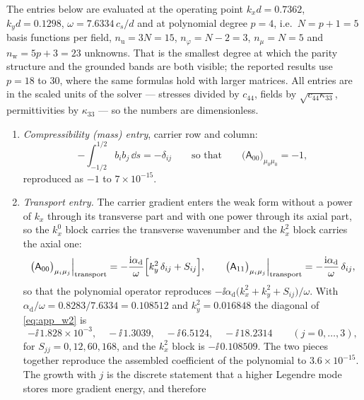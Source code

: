 The entries below are evaluated at the operating point $k_xd=0.7362$,
$k_yd=0.1298$, $\omega=7.6334\,c_s/d$ and at polynomial degree $p=4$, i.e.\
$N=p+1=5$ basis functions per field, $n_{\mathrm{u}}=3N=15$, $n_\varphi=N-2=3$,
$n_\mu=N=5$ and $n_{\mathrm{w}}=5p+3=23$ unknowns.  That is the smallest degree at
which the parity structure and the grounded bands are both visible; the reported
results use $p=18$ to $30$, where the same formulas hold with larger matrices.
All entries are in the scaled units of the solver --- stresses divided by
$c_{44}$, fields by $\sqrt{c_{44}\kappa_{33}}$, permittivities by
$\kappa_{33}$ --- so the numbers are dimensionless.

\begin{enumerate}
\item \emph{Compressibility (mass) entry}, carrier row and column:
\begin{equation}
\label{eq:app_w1}
-\int_{-1/2}^{1/2}b_ib_j\,\dd s=-\delta_{ij}
\qquad\text{so that}\qquad
\bigl(\mathsf A_{00}\bigr)_{\mu_0\mu_0}=-1 ,
\end{equation}
reproduced as $-1$ to $7\times10^{-15}$.
\item \emph{Transport entry.}  The carrier gradient enters the weak form without a
power of $k_x$ through its transverse part and with one power through its axial
part, so the $k_x^{0}$ block carries the transverse wavenumber and the $k_x^{2}$
block carries the axial one:
\begin{equation}
\label{eq:app_w2}
\bigl(\mathsf A_{00}\bigr)_{\mu_i\mu_j}\Big|_{\text{transport}}
=-\frac{\mathrm{i}\alpha_{\mathrm d}}{\omega}\Bigl[k_y^{2}\,\delta_{ij}+S_{ij}\Bigr],
\qquad
\bigl(\mathsf A_{11}\bigr)_{\mu_i\mu_j}\Big|_{\text{transport}}
=-\frac{\mathrm{i}\alpha_{\mathrm d}}{\omega}\,\delta_{ij} ,
\end{equation}
so that the polynomial operator reproduces
$-\ii\alpha_{\mathrm d}\bigl(k_x^{2}+k_y^{2}+S_{ij}\bigr)/\omega$.  With
$\alpha_{\mathrm d}/\omega=0.8283/7.6334=0.108512$ and $k_y^{2}=0.016848$ the
diagonal of \eqref{eq:app_w2} is
\begin{equation}
\label{eq:app_w2_values}
-\ii\,1.828\times10^{-3},\quad -\ii\,1.3039,\quad -\ii\,6.5124,\quad
-\ii\,18.2314 \qquad (j=0,\dots,3),
\end{equation}
for $S_{jj}=0,12,60,168$, and the $k_x^{2}$ block is
$-\ii\,0.108509$.  The two pieces together reproduce the assembled coefficient of
the polynomial to $3.6\times10^{-15}$.  The growth with $j$ is the discrete
statement that a higher Legendre mode stores more gradient energy, and therefore

\end{enumerate}
